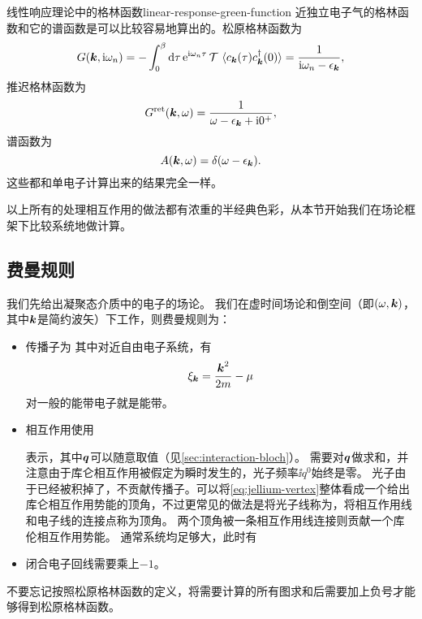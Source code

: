 \begin{back}{线性响应理论中的格林函数}{linear-response-green-function}
    近独立电子气的格林函数和它的谱函数是可以比较容易地算出的。松原格林函数为
    \begin{equation}
        G(\vb*{k}, \mathrm{i} \omega_n) = - \int_0^\beta \dd{\tau} \mathrm{e}^{\mathrm{i} \omega_n \tau} \operatorname{\mathcal{T}} \expval*{c_{\vb*{k}}(\tau) c_{\vb*{k}}^\dagger(0)} = \frac{1}{\mathrm{i} \omega_n - \epsilon_{\vb*{k}}},
    \end{equation}
    推迟格林函数为
    \begin{equation}
        G^\text{ret}(\vb*{k}, \omega) = \frac{1}{\omega - \epsilon_{\vb*{k}} + \mathrm{i} 0^+},
    \end{equation}
    谱函数为
    \begin{equation}
        A(\vb*{k}, \omega) = \delta(\omega - \epsilon_{\vb*{k}}).
    \end{equation}
    这些都和单电子计算出来的结果完全一样。
\end{back}

以上所有的处理相互作用的做法都有浓重的半经典色彩，从本节开始我们在场论框架下比较系统地做计算。

\subsection{费曼规则}

我们先给出凝聚态介质中的电子的场论。
我们在虚时间场论和倒空间（即$(\omega, \vb*{k})$，其中$\vb*{k}$是简约波矢）下工作，则费曼规则为：
\begin{itemize}
    \item 传播子为
    其中对近自由电子系统，有
    \begin{equation}
        \xi_{\vb*{k}} = \frac{\vb*{k}^2}{2m} - \mu
    \end{equation}
    对一般的能带电子就是能带。
    \item 相互作用使用
    
    表示，其中$\vb*{q}$可以随意取值（见\autoref{sec:interaction-bloch}）。
    需要对$\vb*{q}$做求和，并注意由于库仑相互作用被假定为瞬时发生的，光子频率$\ii q^0$始终是零。
    光子由于已经被积掉了，不贡献传播子。可以将\eqref{eq:jellium-vertex}整体看成一个给出库仑相互作用势能的顶角，不过更常见的做法是将光子线称为，将相互作用线和电子线的连接点称为顶角。
    两个顶角被一条相互作用线连接则贡献一个库伦相互作用势能。
    通常系统均足够大，此时有
    \item 闭合电子回线需要乘上$-1$。
\end{itemize}
不要忘记按照松原格林函数的定义，将需要计算的所有图求和后需要加上负号才能够得到松原格林函数。

